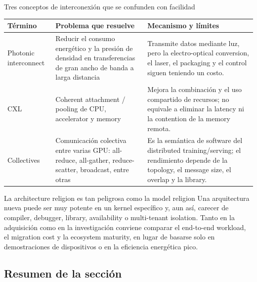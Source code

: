 \documentclass[a4paper]{article}
\begin{document}
\begin{knowledgebox}{Tres conceptos de interconexión que se confunden con facilidad}
\begin{tabularx}{\textwidth}{L{0.19\textwidth}L{0.25\textwidth}X}
\toprule
Término & Problema que resuelve & Mecanismo y límites \\
\midrule
Photonic interconnect & Reducir el consumo energético y la presión de densidad en transferencias de gran ancho de banda a larga distancia & Transmite datos mediante luz, pero la electro-optical conversion, el laser, el packaging y el control siguen teniendo un costo. \\
CXL & Coherent attachment / pooling de CPU, accelerator y memory & Mejora la combinación y el uso compartido de recursos; no equivale a eliminar la latency ni la contention de la memory remota. \\
Collectives & Comunicación colectiva entre varias GPU: all-reduce, all-gather, reduce-scatter, broadcast, entre otras & Es la semántica de software del distributed training/serving; el rendimiento depende de la topology, el message size, el overlap y la library. \\
\bottomrule
\end{tabularx}
\end{knowledgebox}

\begin{warningbox}{La architecture religion es tan peligrosa como la model religion}
Una arquitectura nueva puede ser muy potente en un kernel específico y, aun así, carecer de compiler, debugger, library, availability o multi-tenant isolation. Tanto en la adquisición como en la investigación conviene comparar el end-to-end workload, el migration cost y la ecosystem maturity, en lugar de basarse solo en demostraciones de dispositivos o en la eficiencia energética pico.
\end{warningbox}


\subsection{Resumen de la sección}
\end{document}
